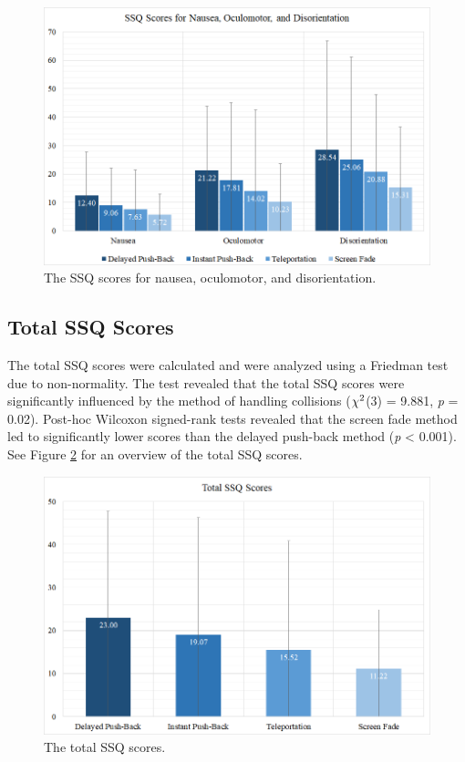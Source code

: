 \begin{figure}[ph]
\centering
\includegraphics[width=1\textwidth]{img/ssq_secondary.png}
\caption{The SSQ scores for nausea, oculomotor, and disorientation.}
\label{fig:ssq_secondary}
\end{figure}

\subsection{Total SSQ Scores}

The total SSQ scores were calculated and were analyzed using a Friedman test due to non-normality. The test revealed that the total SSQ scores were significantly influenced by the method of handling collisions (\textit{$\chi\textsuperscript{2}$}(3) = 9.881, \textit{p} = 0.02). Post-hoc Wilcoxon signed-rank tests revealed that the screen fade method led to significantly lower scores than the delayed push-back method (\textit{p} < 0.001). See Figure \ref{fig:ssq_total} for an overview of the total SSQ scores.

\begin{figure}[ph]
\centering
\includegraphics[width=1\textwidth]{img/ssq_total.png}
\caption{The total SSQ scores.}
\label{fig:ssq_total}
\end{figure}

